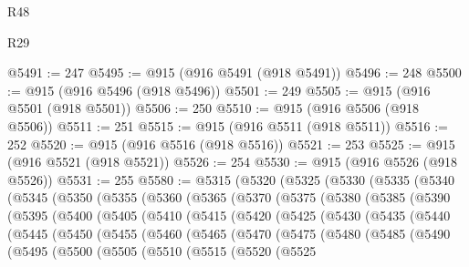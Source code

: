 \begin{lexlean}{R48}
\begin{lexlean}{R29}
\begin{coremodule}
{{{{{{{{{{{{{{{{{{{{{{{{{{{{{{{{{{{{{{{{{{{{{{{{{{{{{{{{{{{{{{{{{{{{{{{{{{{{{{{{{{{{{{{{{{{{{{{{{{{{{{{{{{{{{{{{{{{{{{{{{{{{{{{{{{{{{{{{{{{{{{{{{{{{{{{{{{{{{{{{{{{{{{{{{{{{{{{{{{{{{{{{{{{{{{{{{{{{{{{{{{{{{{{{{{{{{{{{{{@5491 := 247
@5495 := @915 (@916 @5491 (@918 @5491))
@5496 := 248
@5500 := @915 (@916 @5496 (@918 @5496))
@5501 := 249
@5505 := @915 (@916 @5501 (@918 @5501))
@5506 := 250
@5510 := @915 (@916 @5506 (@918 @5506))
@5511 := 251
@5515 := @915 (@916 @5511 (@918 @5511))
@5516 := 252
@5520 := @915 (@916 @5516 (@918 @5516))
@5521 := 253
@5525 := @915 (@916 @5521 (@918 @5521))
@5526 := 254
@5530 := @915 (@916 @5526 (@918 @5526))
@5531 := 255
@5580 := @5315
    (@5320
      (@5325
        (@5330
          (@5335
            (@5340
              (@5345
                (@5350
                  (@5355
                    (@5360
                      (@5365
                        (@5370
                          (@5375
                            (@5380
                              (@5385
                                (@5390
                                  (@5395
                                    (@5400
                                      (@5405
                                        (@5410
                                          (@5415
                                            (@5420
                                              (@5425
                                                (@5430
                                                  (@5435
                                                    (@5440
                                                      (@5445
                                                        (@5450
                                                          (@5455
                                                            (@5460
                                                              (@5465
                                                                (@5470
                                                                  (@5475
                                                                    (@5480
                                                                      (@5485
                                                                        (@5490
                                                                          (@5495
                                                                            (@5500
                                                                              (@5505
                                                                                (@5510
                                                                                  (@5515
                                                                                    (@5520
                                                                                      (@5525
}}}}}}}}}}}}}}}}}}}}}}}}}}}}}}}}}}}}}}}}}}}}}}}}}}}}}}}}}}}}}}}}}}}}}}}}}}}}}}}}}}}}}}}}}}}}}}}}}}}}}}}}}}}}}}}}}}}}}}}}}}}}}}}}}}}}}}}}}}}}}}}}}}}}}}}}}}}}}}}}}}}}}}}}}}}}}}}}}}}}}}}}}}}}}}}}}}}}}}}}}}}}}}}}}}}}}}}}}}
\end{coremodule}
\end{lexlean}
\end{lexlean}
